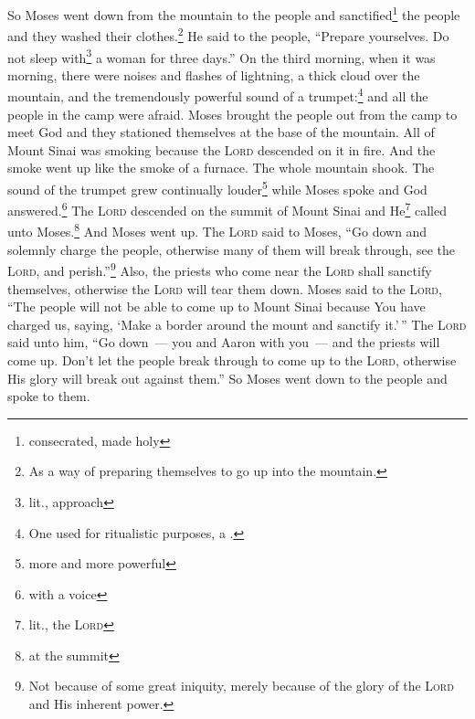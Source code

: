 \begin{inparaenum}
     So Moses went down from the mountain to the people and sanctified\footnote{consecrated, made holy} the people and they washed their clothes.\footnote{As a way of preparing themselves to go up into the mountain.}%
     He said to the people, ``Prepare yourselves. Do not sleep with\footnote{lit., approach} a woman for three days.''%
     On the third morning, when it was morning, there were noises and flashes of lightning, a thick cloud over the mountain, and the tremendously powerful sound of a trumpet:\footnote{One used for ritualistic purposes, a .} and all the people in the camp were afraid.%
     Moses brought the people out from the camp to meet God and they stationed themselves at the base of the mountain.%
     All of Mount Sinai was smoking because the \textsc{Lord} descended on it in fire. And the smoke went up like the smoke of a furnace. The whole mountain shook.%
     The sound of the trumpet grew continually louder\footnote{more and more powerful} while Moses spoke and God answered.\footnote{with a voice}%
     The \textsc{Lord} descended on the summit of Mount Sinai and He\footnote{lit., the \textsc{Lord}} called unto Moses.\footnote{at the summit} And Moses went up.%
     The \textsc{Lord} said to Moses, ``Go down and solemnly charge the people, otherwise many of them will break through, see the \textsc{Lord}, and perish.''\footnote{Not because of some great iniquity, merely because of the glory of the \textsc{Lord} and His inherent power.}%
     Also, the priests who come near the \textsc{Lord} shall sanctify themselves, otherwise the \textsc{Lord} will tear them down.%
     Moses said to the \textsc{Lord}, ``The people will not be able to come up to Mount Sinai because You have charged us, saying, `Make a border around the mount and sanctify it.'\,''%
     The \textsc{Lord} said unto him, ``Go down~--- you and Aaron with you~--- and the priests will come up. Don't let the people break through to come up to the \textsc{Lord}, otherwise His glory will break out against them.''%
     So Moses went down to the people and spoke to them.%
\end{inparaenum}
